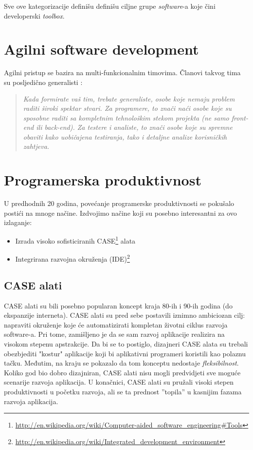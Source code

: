 \documentclass[times, utf8, seminar]{fit}
\begin{document}
Sve ove kategorizacije definišu definišu ciljne grupe  \emph{software}-a koje čini developerski \emph{toolbox}. 
\section{Agilni software development}

Agilni pristup se bazira na multi-funkcionalnim timovima. Članovi takvog tima su posljedično generalisti \citep[str. 19]{agilesamurai}:

\begin{quote}
\emph{Kada formirate vaš tim, trebate generaliste, osobe koje nemaju problem raditi široki spektar stvari. Za programere, to znači naći osobe koje su sposobne raditi sa kompletnim tehnološkim stekom projekta (ne samo front-end ili back-end). Za testere i analiste, to znači osobe koje su spremne obaviti kako uobičajena testiranja, tako i detaljne analize korisničkih zahtjeva.}
\end{quote}

\section{Programerska produktivnost}

U predhodnih 20 godina, povećanje programerske produktivnosti se pokušalo postići na mnoge načine. Izdvojimo načine koji su posebno interesantni za ovo izlaganje:

\begin{itemize}
  \item Izrada visoko sofisticiranih CASE\footnote{\url{http://en.wikipedia.org/wiki/Computer-aided_software_engineering#Tools}} alata
  \item Integrirana razvojna okruženja (IDE)\footnote{\url{http://en.wikipedia.org/wiki/Integrated_development_environment}} 
\end{itemize}

\subsection{CASE alati}

CASE alati su bili posebno popularan koncept kraja 80-ih i 90-ih godina (do ekspanzije interneta). CASE alati su pred sebe postavili iznimno ambiciozan cilj: napraviti okruženje koje će automatizirati kompletan životni ciklus razvoja software-a. Pri tome, zamišljeno je da se sam razvoj aplikacije realizira na visokom stepenu apstrakcije. Da bi se to postiglo, dizajneri CASE alata su trebali obezbjediti "kostur" aplikacije koji bi aplikativni programeri koristili kao polaznu tačku. Međutim, na kraju se pokazalo da tom konceptu nedostaje \emph{fleksibilnost}. Koliko god bio dobro dizajniran,  CASE alati nisu mogli predvidjeti sve moguće scenarije razvoja aplikacija. U konačnici, CASE alati su pružali visoki stepen produktivnosti u početku razvoja, ali se ta prednost ''topila'' u kasnijim fazama razvoja aplikacija. 
\end{document}
